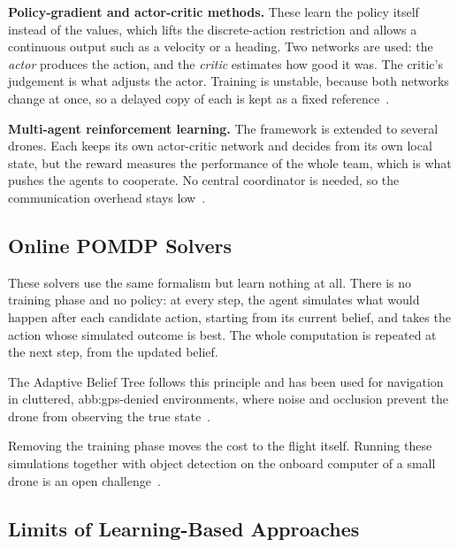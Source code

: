 \textbf{Policy-gradient and actor-critic methods.} These learn the policy itself
instead of the values, which lifts the discrete-action restriction and allows a
continuous output such as a velocity or a heading. Two networks are used: the
\emph{actor} produces the action, and the \emph{critic} estimates how good it
was. The critic's judgement is what adjusts the actor. Training is unstable,
because both networks change at once, so a delayed copy of each is kept as a
fixed reference~\cite{ding2024external}.

\textbf{Multi-agent reinforcement learning.} The framework is extended to several
drones. Each keeps its own actor-critic network and decides from its own local
state, but the reward measures the performance of the whole team, which is what
pushes the agents to cooperate. No central coordinator is needed, so the
communication overhead stays low~\cite{ding2024external}.

\subsection{Online POMDP Solvers}%
\label{subsec:nav:pomdp-solvers}

These solvers use the same formalism but learn nothing at all. There is no
training phase and no policy: at every step, the agent simulates what would
happen after each candidate action, starting from its current belief, and takes
the action whose simulated outcome is best. The whole computation is repeated at
the next step, from the updated belief.

The Adaptive Belief Tree follows this principle and has been used for navigation
in cluttered, \gls{abb:gps}-denied environments, where noise and occlusion
prevent the drone from observing the true state~\cite{sandino2020autonomous}.

Removing the training phase moves the cost to the flight itself. Running these
simulations together with object detection on the onboard computer of a small
drone is an open challenge~\cite{sandino2020autonomous}.

\subsection{Limits of Learning-Based Approaches}%
\label{subsec:nav:learning-limits}

